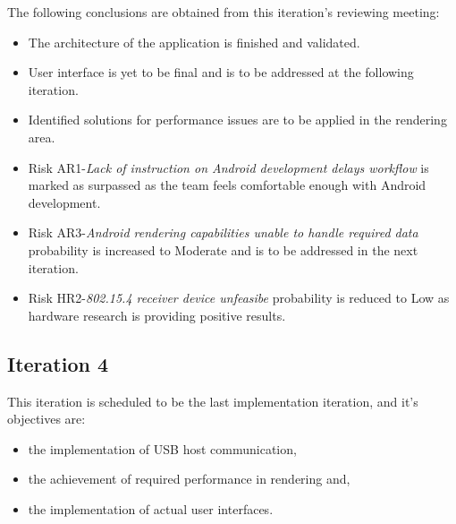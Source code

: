			The following conclusions are obtained from this iteration's reviewing meeting:
			\begin{itemize}
				\item The architecture of the application is finished and validated.
				\item User interface is yet to be final and is to be addressed at the following iteration.
				\item Identified solutions for performance issues are to be applied in the rendering area.
				\item Risk AR1-\emph{Lack of instruction on Android development delays workflow} is marked as surpassed as the team feels comfortable enough with Android development.
				\item Risk AR3-\emph{Android rendering capabilities unable to handle required data} probability is increased to Moderate and is to be addressed in the next iteration.
				\item Risk HR2-\emph{802.15.4 receiver device unfeasibe} probability is reduced to Low as hardware research is providing positive results.
			\end{itemize}

		\subsection{Iteration 4}

			This iteration is scheduled to be the last implementation iteration, and it's objectives are:
			\begin{itemize} 
				\item the implementation of USB host communication,
				\item the achievement of required performance in rendering and, 
				\item the implementation of actual user interfaces.
			\end{itemize}

